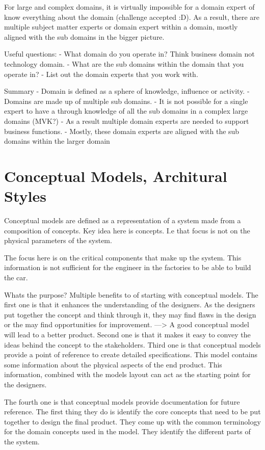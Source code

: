 \documentclass[a4paper, 11pt]{book}
\begin{document}
    For large and complex domains, it is virtually impossible for a domain expert of know everything about the domain (challenge accepted :D).
    As a result, there are multiple subject matter experts or domain expert within a domain, mostly aligned with the sub domains in the bigger picture.

    Useful questions:
    - What domain do you operate in? Think business domain not technology domain.
    - What are the sub domains within the domain that you operate in?
    - List out the domain experts that you work with.

    Summary
    - Domain is defined as a sphere of knowledge, influence or activity.
    - Domains are made up of multiple sub domains.
    - It is not possible for a single expert to have a through knowledge of all the sub domains in a complex large domains (MVK?)
    - As a result multiple domain experts are needed to support business functions.
    - Mostly, these domain experts are aligned with the sub domains within the larger domain


    \section{Conceptual Models, Architural Styles}
    Conceptual models are defined as a representation of a system made from a composition of concepts. Key idea here is concepts.
    I.e that focus is not on the physical parameters of the system.

    The focus here is on the critical components that make up the system.
    This information is not sufficient for the engineer in the factories to be able to build the car.

    Whats the purpose?
    Multiple benefits to of starting with conceptual models.
    The first one is that it enhances the understanding of the designers.
    As the designers put together the concept and think through it, they may find flaws in the design or the may find opportunities for improvement.
    ---> A good conceptual model will lead to a better product.
    Second one is that it makes it easy to convey the ideas behind the concept to the stakeholders.
    Third one is that conceptual models provide a point of reference to create detailed specifications.
    This model contains some information about the physical aspects of the end product.
    This information, combined with the models layout can act as the starting point for the designers.

    The fourth one is that conceptual models provide documentation for future reference.
    The first thing they do is identify the core concepts that need to be put together to design the final product.
    They come up with the common terminology for the domain concepts used in the model.
    They identify the different parts of the system.
\end{document}
